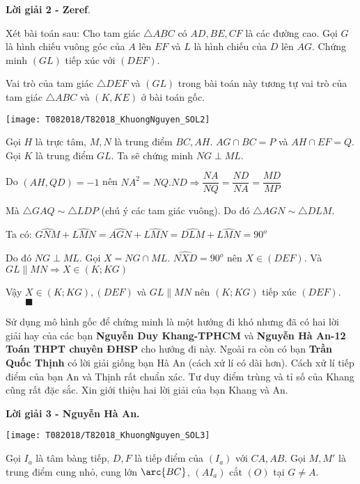 \textbf{Lời giải 2 - Zeref}.

Xét bài toán sau: Cho tam giác $\triangle ABC$ có $AD, BE, CF$ là các đường cao. Gọi $G$ là hình chiếu vuông góc của $A$ lên $EF$ và $L$ là hình chiếu của $D$ lên $AG$. Chứng minh $(GL)$ tiếp xúc với $(DEF)$.

Vai trò của tam giác $\triangle DEF$ và $(GL)$ trong bài toán này tương tự vai trò của tam giác $\triangle ABC$ và $(K, KE)$ ở bài toán gốc.

\begin{center}
	\texttt{[image: T082018/T82018\_KhuongNguyen\_SOL2]}
	
\end{center}

Gọi $H$ là trực tâm, $M,N$ là trung điểm $BC,AH$. $AG \cap BC=P$ và $AH \cap EF=Q$. Gọi $K$ là trung điểm $GL$. Ta sẽ chứng minh $NG \perp ML$.

Do $(AH,QD)=-1$ nên $NA^2=NQ.ND \Rightarrow  \dfrac{NA}{NQ}=\dfrac{ND}{NA}=\dfrac{MD}{MP}$

Mà $\triangle GAQ \sim \triangle LDP$ (chú ý các tam giác vuông). Do đó $\triangle AGN \sim \triangle DLM$.

Ta có: $\widehat{GNM}+\widehat{LMN}=\widehat{AGN}+\widehat{LMN}=\widehat{DLM}+\widehat{LMN}=90^o$

Do đó $NG \perp ML$. Gọi $X=NG \cap ML$. $\widehat{NXD}=90^o$ nên $X \in (DEF)$. Và $GL \parallel MN \Rightarrow X \in (K;KG)$ 

Vậy $X \in (K;KG),(DEF)$ và $GL \parallel MN$ nên $(K;KG)$ tiếp xúc $(DEF)$. $\qquad \blacksquare$

Sử dụng mô hình gốc để chứng minh là một hướng đi khó nhưng đã có hai lời giải hay của các bạn \textbf{Nguyễn Duy Khang-TPHCM} và \textbf{Nguyễn Hà An-12 Toán THPT chuyên ĐHSP} cho hướng đi này. Ngoài ra còn có bạn \textbf{Trần Quốc Thịnh} có lời giải giống bạn Hà An (cách xử lí có dài hơn). Cách xử lí tiếp điểm của bạn An và Thịnh rất chuẩn xác. Tư duy điểm trùng và tỉ số của Khang cũng rất đặc sắc. Xin giới thiệu hai lời giải của bạn Khang và An.

\textbf{Lời giải 3 - Nguyễn Hà An.}

\begin{center}
	\texttt{[image: T082018/T82018\_KhuongNguyen\_SOL3]}
	
\end{center}

Gọi $I_a$ là tâm bàng tiếp, $D,F$ là tiếp điểm của $(I_a)$ với $CA, AB$. Gọi $M,M'$ là trung điểm cung nhỏ, cung lớn $\arc {BC}$, $(AI_a)$ cắt $(O)$ tại $G \neq A$.

